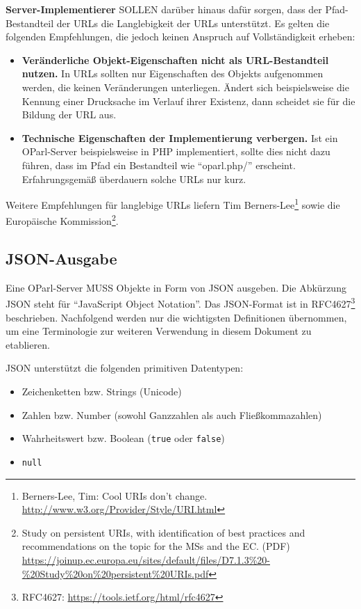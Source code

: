 \documentclass[,a4paper]{article}
\begin{document}
\textbf{Server-Implementierer} SOLLEN darüber hinaus dafür sorgen, dass
der Pfad-Bestandteil der URLs die Langlebigkeit der URLs unterstützt. Es
gelten die folgenden Empfehlungen, die jedoch keinen Anspruch auf
Vollständigkeit erheben:

\begin{itemize}
\item
  \textbf{Veränderliche Objekt-Eigenschaften nicht als URL-Bestandteil
  nutzen.} In URLs sollten nur Eigenschaften des Objekts aufgenommen
  werden, die keinen Veränderungen unterliegen. Ändert sich
  beispielsweise die Kennung einer Drucksache im Verlauf ihrer Existenz,
  dann scheidet sie für die Bildung der URL aus.
\item
  \textbf{Technische Eigenschaften der Implementierung verbergen.} Ist
  ein OParl-Server beispielsweise in PHP implementiert, sollte dies
  nicht dazu führen, dass im Pfad ein Bestandteil wie ``oparl.php/''
  erscheint. Erfahrungsgemäß überdauern solche URLs nur kurz.
\end{itemize}

Weitere Empfehlungen für langlebige URLs liefern Tim
Berners-Lee\footnote{Berners-Lee, Tim: Cool URIs don't change.
  \url{http://www.w3.org/Provider/Style/URI.html}} sowie die Europäische
Kommission\footnote{Study on persistent URIs, with identification of
  best practices and recommendations on the topic for the MSs and the
  EC. (PDF)
  \url{https://joinup.ec.europa.eu/sites/default/files/D7.1.3\%20-\%20Study\%20on\%20persistent\%20URIs.pdf}}.

\subsection{JSON-Ausgabe}\label{json-ausgabe}

Eine OParl-Server MUSS Objekte in Form von JSON ausgeben. Die Abkürzung
JSON steht für ``JavaScript Object Notation''. Das JSON-Format ist in
RFC4627\footnote{RFC4627: \url{https://tools.ietf.org/html/rfc4627}}
beschrieben. Nachfolgend werden nur die wichtigsten Definitionen
übernommen, um eine Terminologie zur weiteren Verwendung in diesem
Dokument zu etablieren.

JSON unterstützt die folgenden primitiven Datentypen:

\begin{itemize}
\itemsep1pt\parskip0pt
\item
  Zeichenketten bzw. Strings (Unicode)
\item
  Zahlen bzw. Number (sowohl Ganzzahlen als auch Fließkommazahlen)
\item
  Wahrheitswert bzw. Boolean (\texttt{true} oder \texttt{false})
\item
  \texttt{null}
\end{itemize}
\end{document}
